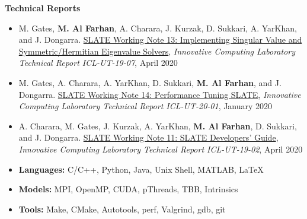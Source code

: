 \documentclass[9pt,a4paper]{extarticle}
\begin{document}
{\textbf{Technical Reports}
\begin{itemize}
\item
M. Gates, \textbf{M. Al Farhan}, A. Charara, J. Kurzak, D. Sukkari, A. YarKhan, and J. Dongarra.
\href{http://www.icl.utk.edu/publications/swan-013}
{{SLATE Working Note 13: Implementing Singular Value and Symmetric/Hermitian Eigenvalue Solvers}},
\textit{Innovative Computing Laboratory Technical Report ICL-UT-19-07}, April 2020
\item
M. Gates, A. Charara, A. YarKhan, D. Sukkari,
\textbf{M. Al Farhan}, and J. Dongarra.
\href{http://www.icl.utk.edu/publications/swan-014}
{{SLATE Working Note 14: Performance Tuning SLATE}},
\textit{Innovative Computing Laboratory Technical Report ICL-UT-20-01}, January 2020
\item
A. Charara, M. Gates, J. Kurzak, A. YarKhan,
\textbf{M. Al Farhan}, D. Sukkari, and J. Dongarra.
\href{http://www.icl.utk.edu/publications/swan-011}
{{SLATE Working Note 11: SLATE Developers' Guide}},
\textit{Innovative Computing Laboratory Technical Report ICL-UT-19-02}, April 2020
\end{itemize}
}
\bigskip

{
\begin{itemize}
\item
{\bf Languages:} C/C++, Python, Java, Unix Shell, MATLAB, \LaTeX
\item
{\bf Models:} MPI, OpenMP, CUDA, pThreads, TBB, Intrinsics
\item
{\bf Tools:} Make, CMake, Autotools, perf, Valgrind, gdb, git
\end{itemize}
}
\bigskip
\end{document}
